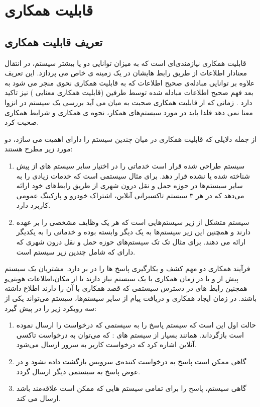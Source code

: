 \chapter{قابلیت همکاری}
\section{تعریف قابلیت همکاری}
قابلیت همکاری  نیازمندی‌ای است که به میزان توانایی دو یا بیشتر سیستم، در انتقال معنادار اطلاعات از طریق رابط  هایشان در یک زمینه ی خاص می پردازد.
این تعریف علاوه بر توانایی مبادله‌ی صحیح اطلاعات که به قابلیت همکاری نحوی  منجر می شود به بعد فهم صحیح اطلاعات مبادله شده توسط طرفین (قابلیت همکاری معنایی  ) نیز تاکید دارد \cite{sudmanns2018semantic} .
زمانی که از قابلیت همکاری صحبت به میان می آید بررسی یک سیستم در انزوا معنا نمی دهد فلذا باید در مورد سیستم‌های همکار، نحوه ی همکاری و شرایط همکاری صحبت کرد.

از جمله دلایلی که قابلیت همکاری در میان چندین سیستم را دارای اهمیت می سازد،‌ دو مورد زیر مطرح هستند:
\begin{enumerate}
\item
سیستم طراحی شده قرار است خدماتی را در اختیار سایر سیستم های از پیش شناخته شده یا نشده قرار دهد. برای مثال  سیستمی است که خدمات زیادی را به سایر سیستم‌ها در حوزه حمل و نقل درون شهری از طریق رابط‌های خود ارائه می‌دهد که در هر ۳ سیستم تاکسیرانی آنلاین، اشتراک خودرو و پارکینگ عمومی کاربرد دارد\cite{interoperability_with_google_maps}.
\item
سیستم متشکل از زیر سیستم‌هایی است که هر یک وظایف مشخصی را بر عهده دارند و همچنین این زیر سیستم‌ها به یک دیگر وابسته بوده و خدماتی را به یکدیگر ارائه می دهند. برای مثال تک تک سیستم‌های حوزه حمل و نقل درون شهری که دارای که شامل چندین زیر سیستم است.
\end{enumerate}

فرآیند همکاری دو مهم کشف و بکارگیری پاسخ ها  را در بر دارد. مشتریان یک سیستم پیش از و یا در زمان همکاری با یک سیستم نیاز دارند تا از مکان‌،اطلاعات هویتی‌و همچنین رابط های در دسترس سیستمی که قصد همکاری با آن را دارند اطلاع داشته باشند. در زمان ایجاد همکاری و دریافت پیام از سایر سیستم‌ها، سیستم می‌تواند یکی از سه رویکرد زیر را در پیش گیرد:
\begin{enumerate}
\item
حالت اول این است که سیستم پاسخ را به سیستمی که درخواست را ارسال نموده است بازگرداند. همانند بسیار از سیستم های  : که می‌توان به درخواست تاکسی آنلاین اشاره کرد که درخواست کاربر به سرور ارسال می‌شود.
\item
گاهی ممکن است پاسخ به درخواست کننده‌ی سرویس بازگشت داده نشود و در عوض پاسخ به سیستمی دیگر ارسال گردد.
\item
گاهی سیستم، پاسخ را برای تمامی سیستم هایی که ممکن است علاقه‌مند باشد ارسال می کند.
\end{enumerate}


